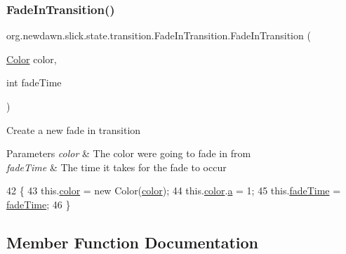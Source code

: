 \subsubsection{\texorpdfstring{Fade\+In\+Transition()}{FadeInTransition()}\hspace{0.1cm}{\footnotesize\ttfamily [3/3]}}
{\footnotesize\ttfamily org.\+newdawn.\+slick.\+state.\+transition.\+Fade\+In\+Transition.\+Fade\+In\+Transition (\begin{DoxyParamCaption}\item[{\mbox{\hyperlink{classorg_1_1newdawn_1_1slick_1_1_color}{Color}}}]{color,  }\item[{int}]{fade\+Time }\end{DoxyParamCaption})\hspace{0.3cm}{\ttfamily [inline]}}

Create a new fade in transition


\begin{DoxyParams}{Parameters}
{\em color} & The color we\textquotesingle{}re going to fade in from \\
\hline
{\em fade\+Time} & The time it takes for the fade to occur \\
\hline
\end{DoxyParams}

\begin{DoxyCode}
42                                                        \{
43         this.\mbox{\hyperlink{classorg_1_1newdawn_1_1slick_1_1state_1_1transition_1_1_fade_in_transition_afaaf133a75453117cbd4250e93f375fc}{color}} = \textcolor{keyword}{new} Color(\mbox{\hyperlink{classorg_1_1newdawn_1_1slick_1_1state_1_1transition_1_1_fade_in_transition_afaaf133a75453117cbd4250e93f375fc}{color}});
44         this.\mbox{\hyperlink{classorg_1_1newdawn_1_1slick_1_1state_1_1transition_1_1_fade_in_transition_afaaf133a75453117cbd4250e93f375fc}{color}}.\mbox{\hyperlink{classorg_1_1newdawn_1_1slick_1_1_color_ab9288c822ff7614a77c887eb8c2595a7}{a}} = 1;
45         this.\mbox{\hyperlink{classorg_1_1newdawn_1_1slick_1_1state_1_1transition_1_1_fade_in_transition_af06dd5e9b2e7da8c3f38d2da3e54e435}{fadeTime}} = \mbox{\hyperlink{classorg_1_1newdawn_1_1slick_1_1state_1_1transition_1_1_fade_in_transition_af06dd5e9b2e7da8c3f38d2da3e54e435}{fadeTime}};
46     \}
\end{DoxyCode}


\subsection{Member Function Documentation}
\mbox{\label{classorg_1_1newdawn_1_1slick_1_1state_1_1transition_1_1_fade_in_transition_ab2f9be16d067c2b63f3093cd93fbe2aa}} 
